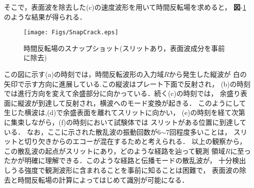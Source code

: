 そこで，表面波を除去した(c)の速度波形を用いて時間反転場を求めると，
{\bf 図}-\ref{fig:snap_crack}のような結果が得られる．
\begin{figure}[thb]
\centering
	\texttt{[image: Figs/SnapCrack.eps]}
	\caption{時間反転場のスナップショット(スリットあり，表面波成分を事前に除去)}
	\label{fig:snap_crack}
\end{figure}
この図に示す(a)の時刻では，時間反転波形の入力域$R$から発生した縦波が
白の矢印で示す方向に進展している.この縦波はプレート下面で反射され，
(b)の時刻では進行方向を変えて余盛部分に向かっている．続く(c)の時刻では，
余盛り表面に縦波が到達して反射され，横波へのモード変換が起きる．
このようにして生じた横波は,(d)で余盛表面を離れてスリットに向かい，
(e)の時刻を経て次第に集束しながら，(f)の時刻において試験体では
スリットがある位置に到達している．
%
なお，ここに示された散乱波の振動回数が6$\sim$7回程度多いことは，
スリットと切り欠きからのエコーが混在するためと考えられる．
%
以上の観察から，この散乱波の起点がスリットにあり，どのような経路を辿って観測
領域$R$に至ったかが明確に理解できる．このような経路と伝播モードの散乱波が，
十分検出しうる強度で観測波形に含まれることを事前に知ることは困難で，
表面波の除去と時間反転場の計算によってはじめて識別が可能になる．
